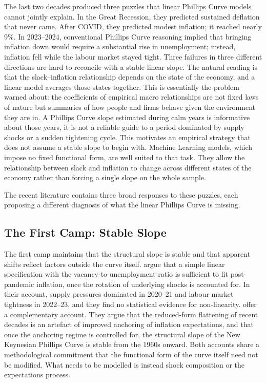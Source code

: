 \documentclass[12pt,a4paper]{article}
\begin{document}
The last two decades produced three puzzles that linear Phillips Curve models cannot jointly explain. In the Great Recession, they predicted sustained deflation that never came. After COVID, they predicted modest inflation; it reached nearly 9\%. In 2023–2024, conventional Phillips Curve reasoning implied that bringing inflation down would require a substantial rise in unemployment; instead, inflation fell while the labour market stayed tight. Three failures in three different directions are hard to reconcile with a stable linear slope. The natural reading is that the slack--inflation relationship depends on the state of the economy, and a linear model averages those states together. This is essentially the problem \citet{lucas1976} warned about: the coefficients of empirical macro relationships are not fixed laws of nature but summaries of how people and firms behave given the environment they are in. A Phillips Curve slope estimated during calm years is informative about those years, it is not a reliable guide to a period dominated by supply shocks or a sudden tightening cycle. This motivates an empirical strategy that does not assume a stable slope to begin with. Machine Learning models, which impose no fixed functional form, are well suited to that task. They allow the relationship between slack and inflation to change across different states of the economy rather than forcing a single slope on the whole sample.

The recent literature contains three broad responses to these puzzles, each proposing a different diagnosis of what the linear Phillips Curve is missing.

\subsection{The First Camp: Stable Slope}
\label{subsec:camp1}

The first camp maintains that the structural slope is stable and that apparent shifts reflect factors outside the curve itself. \citet{bernanke2023} argue that a simple linear specification with the vacancy-to-unemployment ratio is sufficient to fit post-pandemic inflation, once the rotation of underlying shocks is accounted for. In their account, supply pressures dominated in 2020--21 and labour-market tightness in 2022--23, and they find no statistical evidence for non-linearity. \citet{jorgensen2025} offer a complementary account. They argue that the reduced-form flattening of recent decades is an artefact of improved anchoring of inflation expectations, and that once the anchoring regime is controlled for, the structural slope of the New Keynesian Phillips Curve is stable from the 1960s onward. Both accounts share a methodological commitment that the functional form of the curve itself need not be modified. What needs to be modelled is instead shock composition or the expectations process.
\end{document}
